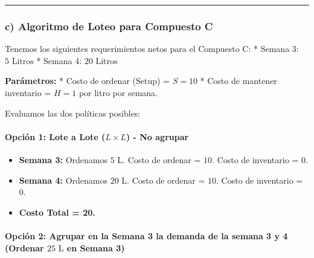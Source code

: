 \documentclass[
]{article}
\providecommand{\tightlist}{%
  \setlength{\itemsep}{0pt}\setlength{\parskip}{0pt}}
\begin{document}
\begin{center}\rule{0.5\linewidth}{0.5pt}\end{center}

\hypertarget{c-algoritmo-de-loteo-para-compuesto-c}{%
\subsubsection{c) Algoritmo de Loteo para Compuesto
C}\label{c-algoritmo-de-loteo-para-compuesto-c}}

Tenemos los siguientes requerimientos netos para el Compuesto C: *
Semana 3: \(5\text{ Litros}\) * Semana 4: \(20\text{ Litros}\)

\textbf{Parámetros:} * Costo de ordenar (Setup) = \(S = 10\) * Costo de
mantener inventario = \(H = 1\) por litro por semana.

Evaluamos las dos políticas posibles:

\hypertarget{opciuxf3n-1-lote-a-lote-l-times-l---no-agrupar}{%
\paragraph{\texorpdfstring{Opción 1: Lote a Lote (\(L \times L\)) - No
agrupar}{Opción 1: Lote a Lote (L \textbackslash times L) - No agrupar}}\label{opciuxf3n-1-lote-a-lote-l-times-l---no-agrupar}}

\begin{itemize}
\tightlist
\item
  \textbf{Semana 3:} Ordenamos \(5\text{ L}\). Costo de ordenar =
  \(10\). Costo de inventario = \(0\).
\item
  \textbf{Semana 4:} Ordenamos \(20\text{ L}\). Costo de ordenar =
  \(10\). Costo de inventario = \(0\).
\item
  \textbf{Costo Total = 20.}
\end{itemize}

\hypertarget{opciuxf3n-2-agrupar-en-la-semana-3-la-demanda-de-la-semana-3-y-4-ordenar-25text-l-en-semana-3}{%
\paragraph{\texorpdfstring{Opción 2: Agrupar en la Semana 3 la demanda
de la semana 3 y 4 (Ordenar \(25\text{ L}\) en Semana
3)}{Opción 2: Agrupar en la Semana 3 la demanda de la semana 3 y 4 (Ordenar 25\textbackslash text\{ L\} en Semana 3)}}\label{opciuxf3n-2-agrupar-en-la-semana-3-la-demanda-de-la-semana-3-y-4-ordenar-25text-l-en-semana-3}}
\end{document}
